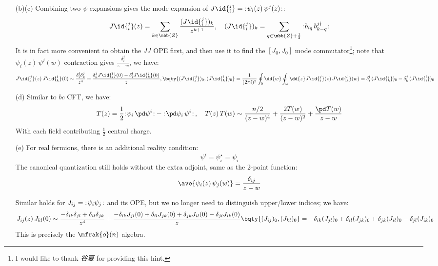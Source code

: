 \documentclass[a4paper,10pt]{article}
\begin{document}
\begin{enumerate}
\begin{enumerate}
	\item[(b)(c)] Combining two $\psi$ expansions gives the mode expansion of $
		J\id{_i^j}
		= \normorder{\psi_i(z)\,\psi^j(z)}
	$:
	\begin{equation}
		J\id{_i^j}(z)
		= \sum_{k\in\mbb{Z}}
			\frac{(J\id{_i^j})_k}{z^{k+1}},\quad
		(J\id{_i^j})_k
		= \sum_{q\in\mbb{Z}+\frac{1}{2}}
			\normorder{
				b_{iq}\,b^{j\dagger}_{k-q}
			}
	\end{equation}
	It is in fact more convenient to obtain the $JJ$ OPE first, and then use it to find the  $[J_0,J_0]$ mode commutator\footnote{
		I would like to thank \textit{谷夏} for providing this hint. 
	}; note that $
		{
			{\psi}_i(z)\,{\psi}^j(w)
		}
	$ contraction gives $\frac{\delta^j_i}{z-w}$, we have:
	\begin{equation}
		J\id{_i^j}(z)\,J\id{_k^l}(0)
		\sim \frac{
			\delta_i^l\delta_k^j
		}{z^4} + \frac{
			\delta^j_k J\id{_i^l}(0)
			- \delta^l_i J\id{_k^j}(0)
		}{z},\\[1ex]
		\bqty{
			(J\id{_i^j})_0, (J\id{_k^l})_0
		}
		= \frac{1}{(2\pi i)^2}
			\oint_0 \dd{w}
			\oint_w \dd{z}
				J\id{_i^j}(z)\,J\id{_k^l}(w)
		= \delta_i^l\,(J\id{_k^j})_0
			- \delta_k^j\,(J\id{_i^l})_0
	\end{equation}
	
	\item[(d)] Similar to $bc$ CFT, we have:
	\begin{equation}
		T(z) = \frac{1}{2} \normorder{\psi_i\,\pd\psi^i}
			- \normorder{\pd\psi_i\,\psi^i}\,
		,\quad
		T(z)\,T(w)
		\sim \frac{n/2}{(z-w)^4}
			+ \frac{2T(w)}{(z-w)^2}
			+ \frac{\pd T(w)}{z-w}
	\end{equation}
	With each field contributing $\frac{1}{2}$ central charge. 
	
	\item[(e)] For real fermions, there is an additional reality condition:
	\begin{equation}
		\psi^i = \psi^\star_i = \psi_i 
	\end{equation}
	The canonical quantization still holds without the extra adjoint, same as the 2-point function:
	\begin{equation}
		\ave{\psi_i(z)\,\psi_j(w)}
		= \frac{\delta_{ij}}{z - w}
	\end{equation}
	
	Similar holds for $J_{ij} = {\mathopen {:}}{{\hskip .1em} \psi_i\psi_j{\hskip .1em}}{\mathclose {:}}$ and its OPE, but we no longer need to distinguish upper/lower indices; we have:
	\begin{equation}
		J_{ij}(z)\,J_{kl}(0)
		\sim \frac{
			- \delta_{ik}\delta_{jl}
			+ \delta_{il}\delta_{jk}
		}{z^4} + \frac{
			- \delta_{ik} J_{jl}(0)
			+ \delta_{il} J_{jk}(0)
			+ \delta_{jk} J_{il}(0)
			- \delta_{jl} J_{ik}(0)
		}{z}\\[1ex]
		\bqty{
			(J_{ij})_0, (J_{kl})_0
		}
		= - \delta_{ik} (J_{jl})_0
			+ \delta_{il} (J_{jk})_0
			+ \delta_{jk} (J_{il})_0
			- \delta_{jl} (J_{ik})_0
	\end{equation}
	This is precisely the $\mfrak{o}(n)$ algebra. 
	\qedfull
	
	\end{enumerate}
	
	
	\end{enumerate}


\printbibliography[%
	,heading = bibintoc
]
\end{document}
